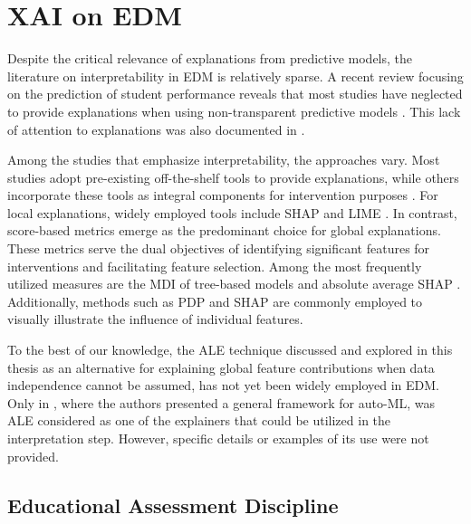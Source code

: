 \section{XAI on EDM}

Despite the critical relevance of explanations from predictive models, the literature on interpretability in EDM is relatively sparse. A recent review focusing on the prediction of student performance reveals that most studies have neglected to provide explanations when using non-transparent predictive models \cite{Chitti2020NeedPrediction}. This lack of attention to explanations was also documented in \cite{Livieris2023AnMining}. 

Among the studies that emphasize interpretability, the approaches vary. Most studies adopt pre-existing off-the-shelf tools to provide explanations, while others incorporate these tools as integral components for intervention purposes \cite{Mu2020TowardsStudents, Afzaal2021ExplainableSelf-Regulation}. For local explanations, widely employed tools include SHAP \cite{Livieris2023AnMining, Chiu2020GenderHypothesis, Doewes2020StructuralScoring, Oliveira2023TowardsEnglish} and LIME \cite{Livieris2023AnMining, Matetic2019MiningNetworks, Zabriskie2019UsingOutcomes, Hasib2022APerformance, Chen2022Week-WiseIntelligence}. In contrast, score-based metrics emerge as the predominant choice for global explanations. These metrics serve the dual objectives of identifying significant features for interventions and facilitating feature selection. Among the most frequently utilized measures are the MDI of tree-based models \cite{Cortez2008UsingPerformance, AshrafATechniques, Zhao2020PredictingData} and absolute average SHAP \cite{Hoq2023AnalysisCourse, Rohani2023EarlyMOOC}. Additionally, methods such as PDP \cite{Hong2022RandomSchool, Masci2018StudentApproach} and SHAP \cite{Chiu2020GenderHypothesis, Hoq2023AnalysisCourse} are commonly employed to visually illustrate the influence of individual features.

To the best of our knowledge, the ALE technique discussed and explored in this thesis as an alternative for explaining global feature contributions when data independence cannot be assumed, has not yet been widely employed in EDM. Only in \cite{NovilloRangone2022AutomationLearning}, where the authors presented a general framework for auto-ML, was ALE considered as one of the explainers that could be utilized in the interpretation step. However, specific details or examples of its use were not provided.

\subsection{Educational Assessment Discipline}

